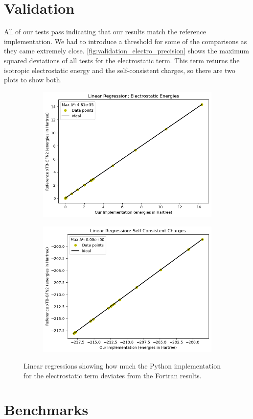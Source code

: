 \section{Validation}

All of our tests pass indicating that our results match the reference implementation. We had to introduce a threshold for some of the comparisons as they came extremely close. \autoref{fig:validation_electro_precision} shows the maximum squared deviations of all tests for the electrostatic term. This term returns the isotropic electrostatic energy and the self-consistent charges, so there are two plots to show both.

\begin{figure}[H]
\centering
\begin{subfigure}{.5\textwidth}
  \centering
  \includegraphics[width=.9\linewidth]{images/results/es_check}
  \label{fig:es_check}
\end{subfigure}%
\begin{subfigure}{.5\textwidth}
  \centering
  \includegraphics[width=.9\linewidth]{images/results/scc_check}
  \label{fig:scc_check}
\end{subfigure}
\caption{Linear regressions showing how much the Python implementation for the electrostatic term deviates from the Fortran results.}
\label{fig:validation_electro_precision}
\end{figure}

\section{Benchmarks}
